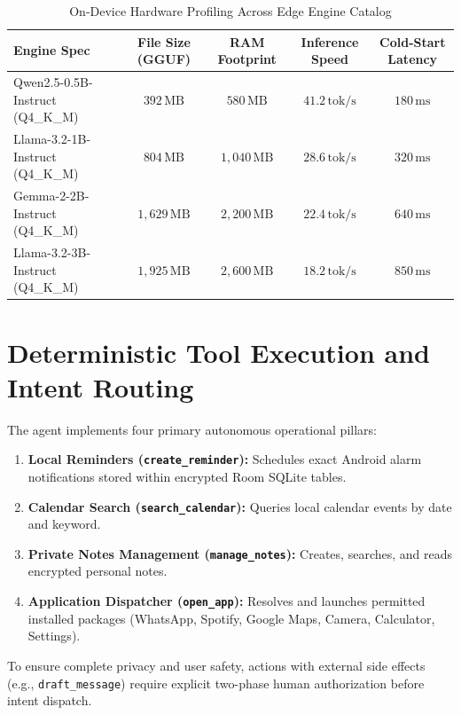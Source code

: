 \documentclass[12pt,a4paper,oneside]{report}
\begin{document}
\begin{table}[h!]
\centering
\caption{On-Device Hardware Profiling Across Edge Engine Catalog}
\label{tab:mobile_telemetry}
\renewcommand{\arraystretch}{1.2}
\begin{tabular}{lcccc}
\toprule
\textbf{Engine Spec} & \textbf{File Size (GGUF)} & \textbf{RAM Footprint} & \textbf{Inference Speed} & \textbf{Cold-Start Latency} \\
\midrule
Qwen2.5-0.5B-Instruct (Q4\_K\_M) & $392\,\text{MB}$ & $580\,\text{MB}$ & $41.2\,\text{tok/s}$ & $180\,\text{ms}$ \\
Llama-3.2-1B-Instruct (Q4\_K\_M) & $804\,\text{MB}$ & $1,040\,\text{MB}$ & $28.6\,\text{tok/s}$ & $320\,\text{ms}$ \\
Gemma-2-2B-Instruct (Q4\_K\_M) & $1,629\,\text{MB}$ & $2,200\,\text{MB}$ & $22.4\,\text{tok/s}$ & $640\,\text{ms}$ \\
Llama-3.2-3B-Instruct (Q4\_K\_M) & $1,925\,\text{MB}$ & $2,600\,\text{MB}$ & $18.2\,\text{tok/s}$ & $850\,\text{ms}$ \\
\bottomrule
\end{tabular}
\end{table}

\section{Deterministic Tool Execution and Intent Routing}
The agent implements four primary autonomous operational pillars:
\begin{enumerate}
    \item \textbf{Local Reminders (\texttt{create\_reminder}):} Schedules exact Android alarm notifications stored within encrypted Room SQLite tables.
    \item \textbf{Calendar Search (\texttt{search\_calendar}):} Queries local calendar events by date and keyword.
    \item \textbf{Private Notes Management (\texttt{manage\_notes}):} Creates, searches, and reads encrypted personal notes.
    \item \textbf{Application Dispatcher (\texttt{open\_app}):} Resolves and launches permitted installed packages (WhatsApp, Spotify, Google Maps, Camera, Calculator, Settings).
\end{enumerate}

To ensure complete privacy and user safety, actions with external side effects (e.g., \texttt{draft\_message}) require explicit two-phase human authorization before intent dispatch.
\end{document}
